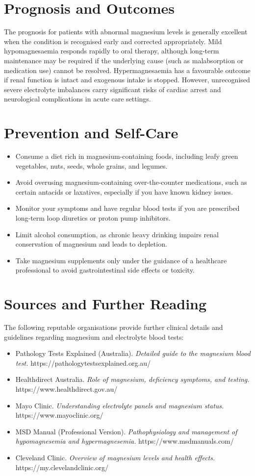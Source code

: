 \section*{Prognosis and Outcomes}
The prognosis for patients with abnormal magnesium levels is generally excellent when the condition is recognised early and corrected appropriately. Mild hypomagnesaemia responds rapidly to oral therapy, although long-term maintenance may be required if the underlying cause (such as malabsorption or medication use) cannot be resolved. Hypermagnesaemia has a favourable outcome if renal function is intact and exogenous intake is stopped. However, unrecognised severe electrolyte imbalances carry significant risks of cardiac arrest and neurological complications in acute care settings.

\section*{Prevention and Self-Care}
\begin{itemize}
    \item Consume a diet rich in magnesium-containing foods, including leafy green vegetables, nuts, seeds, whole grains, and legumes.
    \item Avoid overusing magnesium-containing over-the-counter medications, such as certain antacids or laxatives, especially if you have known kidney issues.
    \item Monitor your symptoms and have regular blood tests if you are prescribed long-term loop diuretics or proton pump inhibitors.
    \item Limit alcohol consumption, as chronic heavy drinking impairs renal conservation of magnesium and leads to depletion.
    \item Take magnesium supplements only under the guidance of a healthcare professional to avoid gastrointestinal side effects or toxicity.
\end{itemize}

\section*{Sources and Further Reading}
The following reputable organisations provide further clinical details and guidelines regarding magnesium and electrolyte blood tests:
\begin{itemize}
    \item Pathology Tests Explained (Australia). \textit{Detailed guide to the magnesium blood test.} https://pathologytestsexplained.org.au/
    \item Healthdirect Australia. \textit{Role of magnesium, deficiency symptoms, and testing.} https://www.healthdirect.gov.au/
    \item Mayo Clinic. \textit{Understanding electrolyte panels and magnesium status.} https://www.mayoclinic.org/
    \item MSD Manual (Professional Version). \textit{Pathophysiology and management of hypomagnesemia and hypermagnesemia.} https://www.msdmanuals.com/
    \item Cleveland Clinic. \textit{Overview of magnesium levels and health effects.} https://my.clevelandclinic.org/
\end{itemize}
